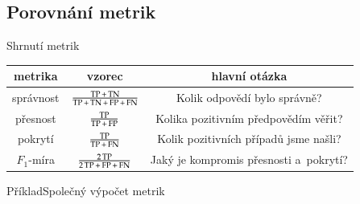 \documentclass[11pt,professionalfont,aspectratio=43]{beamer}
\begin{document}
\subsection{Porovnání metrik}

\begin{frame}{Shrnutí metrik}

    \begin{center}
        \renewcommand{\arraystretch}{1.45}
        \begin{tabular}{c|c|c}
            metrika & vzorec & hlavní otázka \\
            \hline
            správnost &
            \(
            \frac{\operatorname{TP}+\operatorname{TN}}{\operatorname{TP}+\operatorname{TN}+\operatorname{FP}+\operatorname{FN}}
            \) &
            Kolik odpovědí bylo správně? \\
            přesnost &
            \(
            \frac{\operatorname{TP}}{\operatorname{TP}+\operatorname{FP}}
            \) &
            Kolika pozitivním předpovědím věřit? \\
            pokrytí &
            \(
            \frac{\operatorname{TP}}{\operatorname{TP}+\operatorname{FN}}
            \) &
            Kolik pozitivních případů jsme našli? \\
            \(F_1\)-míra &
            \(
            \frac{2\operatorname{TP}}{2\operatorname{TP}+\operatorname{FP}+\operatorname{FN}}
            \) &
            Jaký je kompromis přesnosti a~pokrytí?
        \end{tabular}
    \end{center}

\end{frame}

\begin{frame}{Příklad}{Společný výpočet metrik}



\end{frame}
\end{document}
